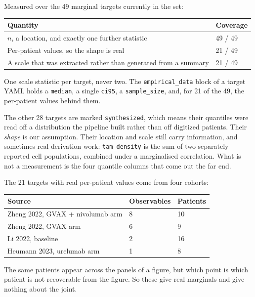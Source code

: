 \documentclass[11pt]{article}
\begin{document}
Measured over the 49 marginal targets currently in the set:

\begin{center}\small
\begin{tabularx}{\textwidth}{@{}Xl@{}}
\toprule
Quantity & Coverage \\
\midrule
$n$, a location, and exactly one further statistic & 49 / 49 \\
Per-patient values, so the shape is real & 21 / 49 \\
A scale that was extracted rather than generated from a summary & 21 / 49 \\
\bottomrule
\end{tabularx}
\end{center}

One scale statistic per target, never two. The \texttt{empirical\_data} block of
a target YAML holds a \texttt{median}, a single \texttt{ci95}, a
\texttt{sample\_size}, and, for 21 of the 49, the per-patient values behind them.

The other 28 targets are marked \texttt{synthesized}, which means their quantiles
were read off a distribution the pipeline built rather than off digitized
patients. Their \emph{shape} is our assumption. Their location and scale still
carry information, and sometimes real derivation work: \texttt{tam\_density} is
the sum of two separately reported cell populations, combined under a
marginalised correlation. What is not a measurement is the four quantile columns
that come out the far end.

The 21 targets with real per-patient values come from four cohorts:

\begin{center}\small
\begin{tabularx}{\textwidth}{@{}Xll@{}}
\toprule
Source & Observables & Patients \\
\midrule
Zheng 2022, GVAX + nivolumab arm & 8 & 10 \\
Zheng 2022, GVAX arm & 6 & 9 \\
Li 2022, baseline & 2 & 16 \\
Heumann 2023, urelumab arm & 1 & 8 \\
\bottomrule
\end{tabularx}
\end{center}

The same patients appear across the panels of a figure, but which point is which
patient is not recoverable from the figure. So these give real marginals and
give nothing about the joint.
\end{document}
